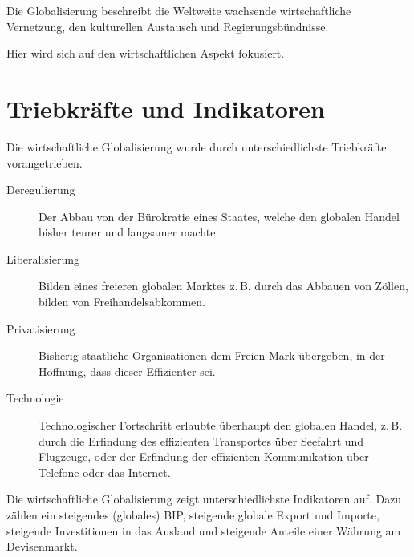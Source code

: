 \documentclass{article}
\begin{document}
Die Globalisierung beschreibt die Weltweite wachsende wirtschaftliche Vernetzung, den kulturellen Austausch und Regierungsbündnisse.
 
Hier wird sich auf den wirtschaftlichen Aspekt fokusiert. 
 
\section{Triebkräfte und Indikatoren}
Die wirtschaftliche Globalisierung wurde durch unterschiedlichste Triebkräfte vorangetrieben.
\begin{description}
 \item[Deregulierung] Der Abbau von der Bürokratie eines Staates, welche den globalen Handel bisher teurer und langsamer machte.
 \item[Liberalisierung] Bilden eines freieren globalen Marktes z.\,B. durch das Abbauen von Zöllen, bilden von Freihandelsabkommen.
 \item[Privatisierung] Bisherig staatliche Organisationen dem Freien Mark übergeben, in der Hoffnung, dass dieser Effizienter sei.
 \item[Technologie] Technologischer Fortschritt erlaubte überhaupt den globalen Handel, z.\,B. durch die Erfindung des effizienten Transportes über Seefahrt und Flugzeuge, oder der Erfindung der effizienten Kommunikation über Telefone oder das Internet.
\end{description}  
Die wirtschaftliche Globalisierung zeigt unterschiedlichste Indikatoren auf. Dazu zählen ein steigendes (globales) BIP, steigende globale Export und Importe, steigende Investitionen in das Ausland und steigende Anteile einer Währung am Devisenmarkt.
\end{document}
